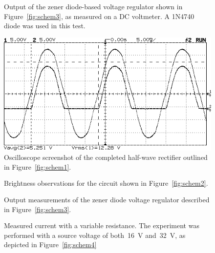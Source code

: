 \begin{figure}[H]
	\centering
	
	\parbox{4.25in}{
	\caption{Output of the zener diode-based voltage regulator shown in
		Figure~\ref{fig:schem3}, as measured on a DC voltmeter.  A 1N4740 diode
		was used in this test.}
	\label{fig:ckt3plot}}
\end{figure}

\begin{figure}[H]
	\centering
	
\end{figure}

\begin{figure}[H]
	\centering
	\includegraphics[width=.6\textwidth]{img/ss1.png}
	\caption{Oscilloscope screenshot of the completed half-wave rectifier
		outlined in Figure~\ref{fig:schem1}.}
	\label{fig:ck1data}
\end{figure}

\begin{figure}[H]
	\centering
	
	\caption{Brightness observations for the circuit shown in
		Figure~\ref{fig:schem2}.}
	\label{tab:ckt2data}
\end{figure}

\begin{figure}[H]
	\centering
	
	\caption{Output measurements of the zener diode voltage
		regulator described in Figure~\ref{fig:schem3}.}
	\label{tab:ckt3data}
\end{figure}

\begin{figure}[H]
	\centering
	
	\caption{Measured current with a variable resistance.  The experiment was
		performed with a source voltage of both~\SI{16}{\volt}
		and~\SI{32}{\volt}, as depicted in Figure~\ref{fig:schem4}}
	\label{tab:ckt4data}
\end{figure}

